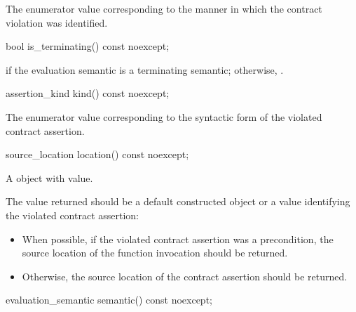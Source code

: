 \begin{itemdescr}
\pnum
\returns
The enumerator value
corresponding to
the manner in which the contract violation was identified.

\end{itemdescr}

\begin{itemdecl}
bool is_terminating() const noexcept;
\end{itemdecl}

\begin{itemdescr}
%
\pnum
\returns
{} if the evaluation semantic is
a terminating semantic;
otherwise, .

\end{itemdescr}

\begin{itemdecl}
assertion_kind kind() const noexcept;
\end{itemdecl}

\begin{itemdescr}
\pnum
\returns
The enumerator value
corresponding to
the syntactic form of the violated contract assertion.

\end{itemdescr}

\begin{itemdecl}
source_location location() const noexcept;
\end{itemdecl}

\begin{itemdescr}
\pnum
\returns
A  object
with
value.

\pnum
\recommended
The value returned should be
a default constructed  object
or a value identifying the violated contract assertion:
\begin{itemize}
\item
When possible,
if the violated contract assertion was a precondition,
the source location of the function invocation should be returned.
\item
Otherwise,
the source location of the contract assertion should be returned.
\end{itemize}

\end{itemdescr}

\begin{itemdecl}
evaluation_semantic semantic() const noexcept;
\end{itemdecl}

